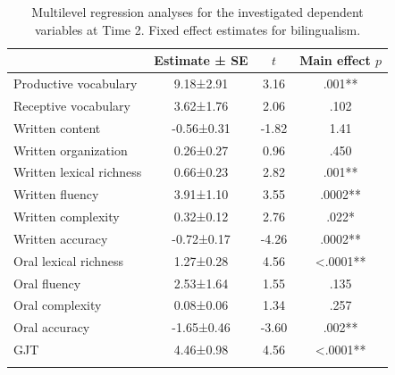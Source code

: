 \documentclass[output=paper,modfonts,nonflat,newtxmath]{langsci/langscibook}
\begin{document}
\begin{table}
	\caption{\label{tab:pfenninger:8}Multilevel regression analyses for the investigated dependent variables at Time 2. Fixed effect estimates for bilingualism.}
    \begin{tabular}{lS[table-format=-1.3,parse-numbers=false]S[table-format=-1.2]S[table-format=<1.4]}
		\lsptoprule
		& {Estimate ± SE} & {$t$}  & {Main effect $p$}\\\midrule
		Productive vocabulary & 9.18±2.91 & 3.16 & .001**\\
		Receptive vocabulary & 3.62±1.76 & 2.06 & .102\\
		Written content & -0.56±0.31 & -1.82 & 1.41\\
		Written organization & 0.26±0.27 & 0.96 & .450\\
		Written lexical richness & 0.66±0.23 & 2.82 & .001**\\
		Written fluency & 3.91±1.10 & 3.55 & .0002**\\
		Written complexity & 0.32±0.12 & 2.76 & .022*\\
		Written accuracy & -0.72±0.17 & -4.26 & .0002**\\
		Oral lexical richness & 1.27±0.28 & 4.56 & <.0001**\\
		Oral fluency & 2.53±1.64 & 1.55 & .135\\
		Oral complexity & 0.08±0.06 & 1.34 & .257\\
		Oral accuracy & -1.65±0.46 & -3.60 & .002**\\
		GJT & 4.46±0.98 & 4.56 & <.0001**\\
		\lspbottomrule
	\end{tabular}
	
\end{table}
\end{document}
